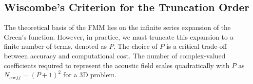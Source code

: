 \subsection{Wiscombe's Criterion for the Truncation Order}
The theoretical basis of the \ac{FMM} lies on the infinite series expansion of the Green's function. However, in practice, we must truncate this expansion to a finite number of terms, denoted as $P$. The choice of $P$ is a critical trade-off between accuracy and computational cost. The number of complex-valued coefficients required to represent the acoustic field scales quadratically with $P$ as $N_{coeff} = (P + 1)^2$ for a 3D problem.

